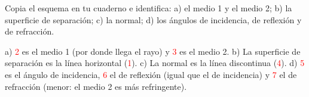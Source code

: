 \begin{exercise}
    Copia el esquema en tu cuaderno e identifica: a) el medio 1 y el medio 2; b) la superficie de separación; c) la normal; d) los ángulos de incidencia, de reflexión y de refracción.
    \begin{center}
    \end{center}
    \begin{solu}
        a) \textcolor{red}{2} es el medio 1 (por donde llega el rayo) y \textcolor{red}{3} es el medio 2. b) La superficie de separación es la línea horizontal (\textcolor{red}{1}). c) La normal es la línea discontinua (\textcolor{red}{4}). d) \textcolor{red}{5} es el ángulo de incidencia, \textcolor{red}{6} el de reflexión (igual que el de incidencia) y \textcolor{red}{7} el de refracción (menor: el medio 2 es más refringente).
    \end{solu}
\end{exercise}

